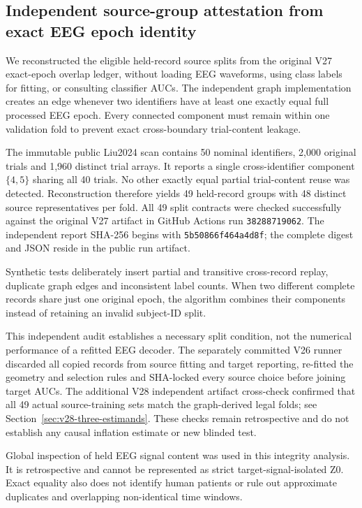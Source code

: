 \subsection{Independent source-group attestation from exact EEG epoch identity}
\label{sec:v28-independent-graph}
We reconstructed the eligible held-record source splits from the
original V27 exact-epoch overlap ledger, without loading EEG waveforms,
using class labels for fitting, or consulting classifier AUCs.
The independent graph implementation creates an edge whenever two
identifiers have at least one exactly equal full processed EEG epoch.
Every connected component must remain within one validation fold
to prevent exact cross-boundary trial-content leakage.

The immutable public Liu2024 scan contains 50 nominal identifiers,
2,000 original trials and 1,960 distinct trial arrays. It reports
a single cross-identifier component $\{4,5\}$ sharing all 40 trials.
No other exactly equal partial trial-content reuse was detected.
Reconstruction therefore yields 49 held-record groups with 48
distinct source representatives per fold. All 49 split contracts
were checked successfully against the original V27 artifact in
GitHub Actions run \texttt{38288719062}. The independent
report SHA-256 begins with \texttt{5b50866f464a4d8f};
the complete digest and JSON reside in the public run artifact.

Synthetic tests deliberately insert partial and transitive
cross-record replay, duplicate graph edges and inconsistent
label counts. When two different complete records share just
one original epoch, the algorithm combines their components
instead of retaining an invalid subject-ID split.

This independent audit establishes a necessary split condition,
not the numerical performance of a refitted EEG decoder.
The separately committed V26 runner discarded all
copied records from source fitting and target reporting,
re-fitted the geometry and selection rules and SHA-locked
every source choice before joining target AUCs. The
additional V28 independent artifact cross-check
confirmed that all 49 actual source-training sets
match the graph-derived legal folds; see
Section~\ref{sec:v28-three-estimands}. These
checks remain retrospective and do not establish
any causal inflation estimate or new blinded test.

Global inspection of held EEG signal content was used in
this integrity analysis. It is retrospective and cannot
be represented as strict target-signal-isolated Z0.
Exact equality also does not identify human patients
or rule out approximate duplicates and overlapping
non-identical time windows.

